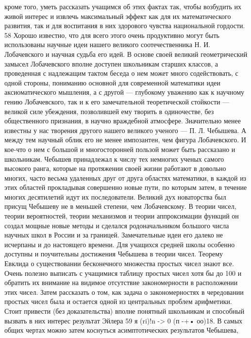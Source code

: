 \documentclass[12pt, a4paper, openany]{book}
\begin{document}
кроме того, уметь рассказать учащимся об этих фактах 
так, чтобы возбудить их живой интерес и извлечь  
максимальный эффект как для их математического развития, 
так и для воспитания в них здорового чувства  
национальной гордости. 
58 
Хорошо известно, что для всего этого очень продуктивно 
могут быть использованы научные идеи нашего великого 
соотечественника Н. И. Лобачевского и научная судьба 
его идей. В основе своей великий геометрический замысел 
Лобачевского вполне доступен школьникам старших  
классов, а проведенная с надлежащим тактом беседа о нем 
может много содействовать, с одной стороны, пониманию 
основной для современной математики идеи  
аксиоматического мышления, а с другой — глубокому уважению как 
к научному гению Лобачевского, так и к его замечательной 
теоретической стойкости — великой силе убеждения,  
позволившей ему творить в одиночестве, без общественного 
признания, в научно враждебной атмосфере. 
Значительно менее известны у нас творения другого 
нашего великого ученого — П. Л. Чебышева. А между 
тем научный облик его не менее импозантен, чем фигура 
Лобачевского. И кое-что о нем с большой и многосторонней 
пользой может быть рассказано и школьникам. Чебышев 
принадлежал к числу тех немногих ученых самого  
высокого ранга, которые на протяжении своей жизни работают 
в довольно многих, часто весьма удаленных друг от друга 
областях математики, в каждой из этих областей  
прокладывая совершенно новые пути, по которым затем, в течение 
многих десятилетий идут их последователи. Великий дух 
новаторства был присущ Чебышеву не в меньшей степени, 
чем Лобачевскому. В теории чисел, теории вероятностей, 
теории механизмов и теории аппроксимации функций он 
создал мощные новые методы и сделался родоначальником 
большого числа научных школ в России и за границей. 
Замечательные идеи его далеко не исчерпаны и до  
настоящего времени. 
Для учащихся средней школы особенно доступны и  
поучительны достижения Чебышева в теории чисел. Теорему 
Евклида о существовании бесконечного множества  
простых чисел знают все. Очень полезно выписать с учащимися 
таблицу простых чисел хотя бы до 100 и обратить их  
внимание на видимое отсутствие закономерности в  
расположении этих чисел. Затем рассказать о том, как задача о  
закономерностях в чередовании простых чисел была и  
остается одной из центральных проблем арифметики. Стоит  
привести (без доказательства) вполне понятный школьникам 
и способный вызвать в них интерес результат Эйлера 
59 
я (ri)!n -> 0 (п -+• оо)18. В самых общих чертах можно 
затем коснуться асимптотических результатов Чебышева, 
\end{document}
